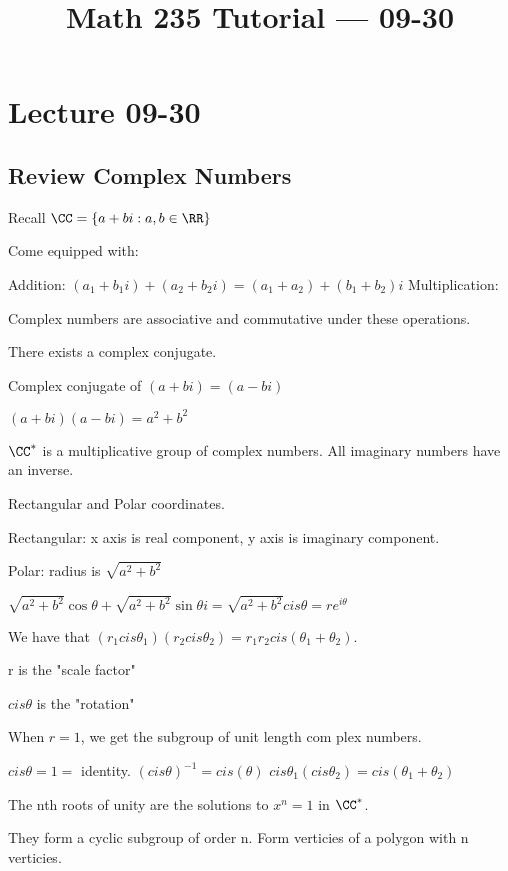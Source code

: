 \documentclass[class=scrartcl, crop=false]{standalone}
\title{Math 235 Tutorial --- 09-30}
\begin{document}
\section{Lecture 09-30}

\subsection{Review Complex Numbers}

Recall $\CC = \{a + bi: a, b \in \RR\}$

Come equipped with:
\begin{enumerate}
  \ii
  Addition: $(a_1 + b_1i) + (a_2 + b_2i) = (a_1 + a_2) + (b_1 + b_2)i$
  \ii
  Multiplication:
\end{enumerate}

Complex numbers are associative and commutative under these operations.

There exists a complex conjugate.
\begin{example}
  Complex conjugate of $(a + bi) = (a - bi)$
\end{example}
\begin{note}
  $(a + bi)(a - bi) = a^2 + b^2$
\end{note}

$\CC^*$ is a multiplicative group of complex numbers. All imaginary numbers have an inverse.

Rectangular and Polar coordinates.

Rectangular: x axis is real component, y axis is imaginary component.

Polar: radius is $\sqrt{a^2 + b^2}$

$\sqrt{a^2 + b^2}\cos{\theta} + \sqrt{a^2 + b^2}\sin{\theta}i = \sqrt{a^2 + b^2}cis\theta = re^{i\theta}$

We have that $(r_1cis\theta_1)(r_2cis\theta_2) = r_1r_2cis(\theta_1 + \theta_2)$.

r is the "scale factor"

$cis\theta$ is the "rotation"

When $r = 1$, we get the subgroup of unit length com plex numbers.

$cis\theta = 1 =$ identity.
$(cis\theta)^{-1} = cis(\theta)$
$cis\theta_1(cis\theta_2) = cis(\theta_1 + \theta_2)$

The nth roots of unity are the solutions to $x^n = 1$ in $\CC^*$.

They form a cyclic subgroup of order n.
Form verticies of a polygon with n verticies.
\end{document}
